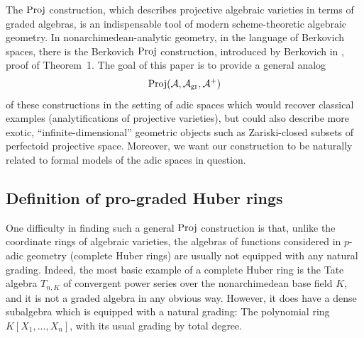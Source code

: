 \documentclass[12pt,twoside,a4paper]{article}
\theoremstyle{definition}
\theoremstyle{remark}
\newcommand\gr{{\rm gr}}
\newcommand\Proj{{\rm Proj}}
\begin{document}
The $\Proj$ construction, which describes projective algebraic varieties in terms of graded algebras, is an indispensable tool of modern scheme-theoretic algebraic geometry. In nonarchimedean-analytic geometry, in the language of Berkovich spaces, there is the Berkovich $\Proj$ construction, introduced by Berkovich in \cite{Berkovich95Drinfeld}, proof of Theorem~1. The goal of this paper is to provide a general analog \begin{equation*}\Proj(\mathcal{A}, \mathcal{A}_{\gr}, \mathcal{A}^{+})\end{equation*}of these constructions in the setting of adic spaces which would recover classical examples (analytifications of projective varieties), but could also describe more exotic, ``infinite-dimensional'' geometric objects such as Zariski-closed subsets of perfectoid projective space. Moreover, we want our construction to be naturally related to formal models of the adic spaces in question. 

\subsection{Definition of pro-graded Huber rings}

One difficulty in finding such a general $\Proj$ construction is that, unlike the coordinate rings of algebraic varieties, the algebras of functions considered in $p$-adic geometry (complete Huber rings) are usually not equipped with any natural grading. Indeed, the most basic example of a complete Huber ring is the Tate algebra $T_{n, K}$ of convergent power series over the nonarchimedean base field $K$, and it is not a graded algebra in any obvious way. However, it does have a dense subalgebra which is equipped with a natural grading: The polynomial ring $K[X_1,\dots, X_n]$, with its usual grading by total degree. 
\end{document}
